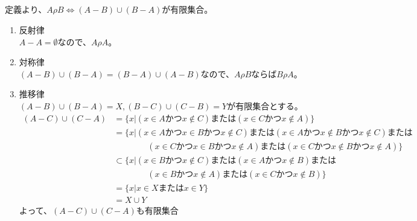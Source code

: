\documentclass{jsarticle}
\begin{document}
\subsection{}
定義より、$A\rho B\Longleftrightarrow (A-B)\cup(B-A)が有限集合$。
\begin{enumerate}
\item 反射律\\
$A-A=\emptyset$なので、$A\rho A$。
\item 対称律\\
$(A-B)\cup(B-A)=(B-A)\cup(A-B)$なので、$A\rho B$ならば$B\rho A$。
\item 推移律\\
$(A-B)\cup(B-A)=X,(B-C)\cup(C-B)=Y$が有限集合とする。
\begin{align*}
(A-C)\cup(C-A)&=\{x|(x\in A かつ x\notin C)または(x\in Cかつx\notin A)\}\\
&=\{x|(x\in A かつ x\in B かつ x\notin C)または(x\in A かつ x\notin Bかつx\notin C)または\\
&\qquad\qquad(x\in Cかつx\in Bかつx\notin A)または(x\in Cかつx\notin Bかつx\notin A)\}\\
&\subset\{x|(x\in B かつ x\notin C)または(x\in A かつ x\notin B)または\\
&\qquad\qquad(x\in Bかつx\notin A)または(x\in Cかつx\notin B)\}\\
&=\{x|x\in X またはx\in Y\}\\
&=X\cup Y
\end{align*}
よって、$(A-C)\cup(C-A)$も有限集合
\end{enumerate}
\end{document}
